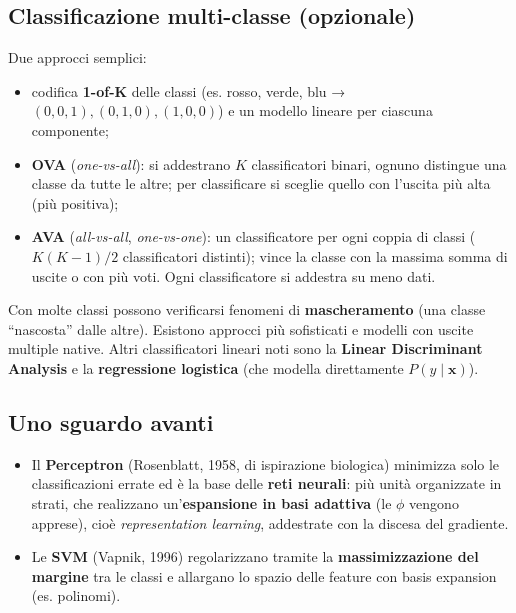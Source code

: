 \subsection{Classificazione multi-classe
(opzionale)}\label{classificazione-multi-classe-opzionale}

Due approcci semplici:

\begin{itemize}
\tightlist
\item
  codifica \textbf{1-of-K} delle classi (es. rosso, verde, blu →
  \((0,0,1), (0,1,0), (1,0,0)\)) e un modello lineare per ciascuna
  componente;
\item
  \textbf{OVA} (\emph{one-vs-all}): si addestrano \(K\) classificatori
  binari, ognuno distingue una classe da tutte le altre; per
  classificare si sceglie quello con l'uscita più alta (più positiva);
\item
  \textbf{AVA} (\emph{all-vs-all}, \emph{one-vs-one}): un classificatore
  per ogni coppia di classi (\(K(K-1)/2\) classificatori distinti);
  vince la classe con la massima somma di uscite o con più voti. Ogni
  classificatore si addestra su meno dati.
\end{itemize}

Con molte classi possono verificarsi fenomeni di \textbf{mascheramento}
(una classe ``nascosta'' dalle altre). Esistono approcci più sofisticati
e modelli con uscite multiple native. Altri classificatori lineari noti
sono la \textbf{Linear Discriminant Analysis} e la \textbf{regressione
logistica} (che modella direttamente \(P(y \mid \mathbf{x})\)).

\subsection{Uno sguardo avanti}\label{uno-sguardo-avanti}

\begin{itemize}
\tightlist
\item
  Il \textbf{Perceptron} (Rosenblatt, 1958, di ispirazione biologica)
  minimizza solo le classificazioni errate ed è la base delle
  \textbf{reti neurali}: più unità organizzate in strati, che realizzano
  un'\textbf{espansione in basi adattiva} (le \(\phi\) vengono apprese),
  cioè \emph{representation learning}, addestrate con la discesa del
  gradiente.
\item
  Le \textbf{SVM} (Vapnik, 1996) regolarizzano tramite la
  \textbf{massimizzazione del margine} tra le classi e allargano lo
  spazio delle feature con basis expansion (es. polinomi).
\end{itemize}

